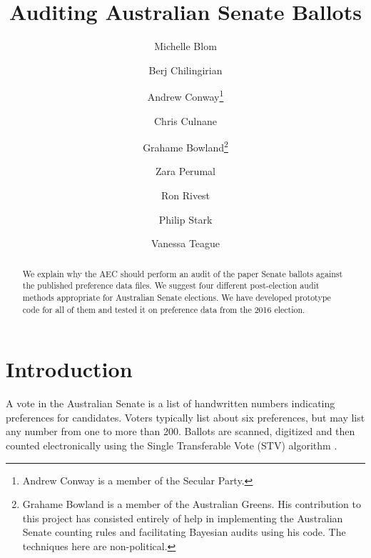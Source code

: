 \documentclass[10pt,a4paper]{article}
\begin{document}


\title{Auditing Australian Senate Ballots}
\author[1]{Michelle Blom}
\author[2]{Berj Chilingirian}
\author[ ]{Andrew Conway\thanks{Andrew Conway is a member of the Secular Party.   }}
\author[1]{Chris Culnane}
\author[ ]{Grahame Bowland\thanks{Grahame Bowland is a member of the Australian Greens.  His contribution to this project has consisted entirely of help in implementing the Australian Senate counting rules and facilitating Bayesian audits using his code. The techniques here are non-political. }}
\author[2]{Zara Perumal}
\author[2]{Ron Rivest}
\author[3]{Philip Stark}
\author[1]{Vanessa Teague}
\maketitle

\tableofcontents

\begin{abstract}
We explain why the AEC should perform an audit of the paper Senate  ballots against the published preference data files.  We suggest four different post-election audit methods appropriate for Australian Senate elections.  We have developed prototype code for all of them and tested it on preference data from the 2016 election.  
\end{abstract}

\section{Introduction}
A vote in the Australian Senate is a list of handwritten numbers indicating preferences for candidates.  Voters typically list about six preferences, but may list any number from one to more than 200.  Ballots are scanned, digitized and then counted electronically  using the Single Transferable Vote (STV) algorithm \cite{AECSenateCounting}.  
\end{document}
